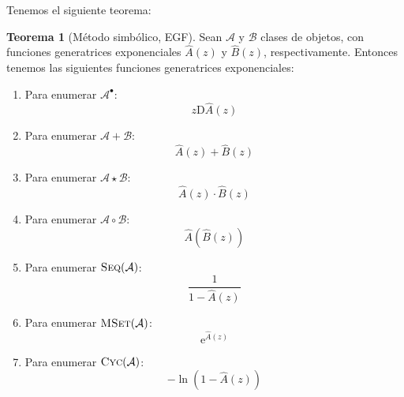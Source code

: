 \documentclass[english, spanish, fleqn, 10pt]{article}
\numberwithin{equation}{section}
\theoremstyle{definition}
\newtheorem{teorema}{Teorema}[section]
\DeclareMathOperator{\Seq}{\textsc{Seq}}
\DeclareMathOperator{\Cyc}{\textsc{Cyc}}
\DeclareMathOperator{\MSet}{\textsc{MSet}}
\begin{document}
Tenemos el siguiente teorema:
\begin{teorema}[Método simbólico, EGF]
	\label{theo:ms-EGF}
	Sean \(\mathcal{A}\) y \(\mathcal{B}\) clases de objetos,
	con funciones generatrices exponenciales
	\(\widehat{A}(z)\) y \(\widehat{B}(z)\),
	respectivamente.
	Entonces tenemos
	las siguientes funciones generatrices exponenciales:
	\begin{enumerate}
		\item
		Para enumerar \(\mathcal{A}^\bullet\):
		\begin{equation*}
		z \mathrm{D} \widehat{A}(z)
		\end{equation*}
		\item
		Para enumerar \(\mathcal{A} + \mathcal{B}\):
		\begin{equation*}
		\widehat{A}(z) + \widehat{B}(z)
		\end{equation*}
		\item
		Para enumerar \(\mathcal{A} \star \mathcal{B}\):
		\begin{equation*}
		\widehat{A}(z) \cdot \widehat{B}(z)
		\end{equation*}
		\item
		Para enumerar \(\mathcal{A} \circ \mathcal{B}\):
		\begin{equation*}
		\widehat{A}(\widehat{B}(z))
		\end{equation*}
		\item
		Para enumerar \(\Seq(\mathcal{A})\):
		\begin{equation*}
		\frac{1}{1 - \widehat{A}(z)}
		\end{equation*}
		\item
		Para enumerar \(\MSet(\mathcal{A})\):
		\begin{equation*}
		\mathrm{e}^{\widehat{A}(z)}
		\end{equation*}
		\item
		Para enumerar \(\Cyc(\mathcal{A})\):
		\begin{equation*}
		-\ln(1 - \widehat{A}(z))
		\end{equation*}
	\end{enumerate}
\end{teorema}
\end{document}
